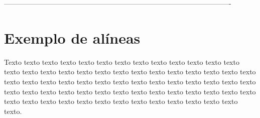 









\iffalse
-------------------------------------------------------------------------------------------------



\section{Exemplo de alíneas}\label{sec:exemplo-de-algoritmos-e-figuras}

    Texto texto texto texto texto texto texto texto texto texto texto texto texto texto texto texto texto texto texto texto texto texto texto texto texto texto texto texto texto texto texto texto texto texto texto texto texto texto texto texto texto texto texto texto texto texto texto texto texto texto texto texto texto texto texto texto texto texto texto texto texto texto texto texto texto texto texto texto texto.

